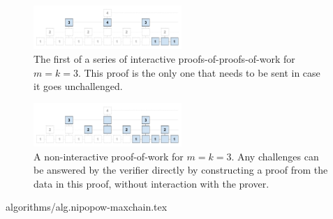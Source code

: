 \begin{figure}[h]
    \caption{The first of a series of interactive proofs-of-proofs-of-work for
    $m = k = 3$. This proof is the only one that needs to be sent in case it
    goes unchallenged.}
    \centering
    \includegraphics[width=0.5\textwidth,keepaspectratio]{figures/interactive-popow.png}
\end{figure}

\begin{figure}[h]
    \caption{A non-interactive proof-of-work for $m = k = 3$. Any challenges
    can be answered by the verifier directly by constructing a proof from the
    data in this proof, without interaction with the prover.}
    \centering
    \includegraphics[width=0.5\textwidth,keepaspectratio]{figures/non-interactive-popow.png}
\end{figure}

{algorithms/alg.nipopow-maxchain.tex}

